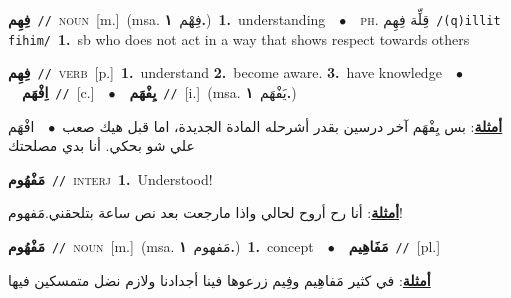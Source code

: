 \documentclass[10pt,a4paper,twoside]{article} %
\begin{document}
\begin{multicols}{2}
{\setlength\topsep{0pt}\textbf{\foreignlanguage{arabic}{فِهِم}}\ {\color{gray}\texttt{//}\color{black}}\ \textsc{noun}\ [m.]\ \color{gray}(msa. \foreignlanguage{arabic}{فِهْم}~\foreignlanguage{arabic}{\textbf{١.}})\color{black}\ \textbf{1.}~understanding\ \ $\bullet$\ \ \textsc{ph.} \color{gray} \foreignlanguage{arabic}{قِلِّة فِهِم}\color{black}\ {\color{gray}\texttt{/{\sffamily (q)illit fihim}/}\color{black}}\ \textbf{1.}~sb who does not act in a way that shows respect towards others\ } \vspace{2mm}

{\setlength\topsep{0pt}\textbf{\foreignlanguage{arabic}{فِهِم}}\ {\color{gray}\texttt{//}\color{black}}\ \textsc{verb}\ [p.]\ \textbf{1.}~understand  \textbf{2.}~become aware.  \textbf{3.}~have knowledge\ \ $\bullet$\ \ \setlength\topsep{0pt}\textbf{\foreignlanguage{arabic}{اِفْهَم}}\ {\color{gray}\texttt{//}\color{black}}\ [c.]\ \ $\bullet$\ \ \setlength\topsep{0pt}\textbf{\foreignlanguage{arabic}{يِفْهَم}}\ {\color{gray}\texttt{//}\color{black}}\ [i.]\ \color{gray}(msa. \foreignlanguage{arabic}{يَفْهَم}~\foreignlanguage{arabic}{\textbf{١.}})\color{black}\  \begin{flushright}\color{gray}\foreignlanguage{arabic}{\textbf{\underline{\foreignlanguage{arabic}{أمثلة}}}: بس يِفْهَم آخر درسين بقدر أشرحله المادة الجديدة، اما قبل هيك صعب\ $\bullet$\ \  افْهَم علي شو بحكي. أنا بدي مصلحتك}\end{flushright}\color{black}} \vspace{2mm}

{\setlength\topsep{0pt}\textbf{\foreignlanguage{arabic}{مَفْهُوم}}\ {\color{gray}\texttt{//}\color{black}}\ \textsc{interj}\ \textbf{1.}~Understood!\  \begin{flushright}\color{gray}\foreignlanguage{arabic}{\textbf{\underline{\foreignlanguage{arabic}{أمثلة}}}: أنا رح أروح لحالي واذا مارجعت بعد نص ساعة بتلحقني.مَفهوم!}\end{flushright}\color{black}} \vspace{2mm}

{\setlength\topsep{0pt}\textbf{\foreignlanguage{arabic}{مَفْهُوم}}\ {\color{gray}\texttt{//}\color{black}}\ \textsc{noun}\ [m.]\ \color{gray}(msa. \foreignlanguage{arabic}{مَفهوم}~\foreignlanguage{arabic}{\textbf{١.}})\color{black}\ \textbf{1.}~concept\ \ $\bullet$\ \ \setlength\topsep{0pt}\textbf{\foreignlanguage{arabic}{مَفَاهِيم}}\ {\color{gray}\texttt{//}\color{black}}\ [pl.]\  \begin{flushright}\color{gray}\foreignlanguage{arabic}{\textbf{\underline{\foreignlanguage{arabic}{أمثلة}}}: في كثير مَفاهِيم وفِيم زرعوها فينا أجدادنا ولازم نضل متمسكين فيها}\end{flushright}\color{black}} \vspace{2mm}


\end{multicols}
\end{document}
